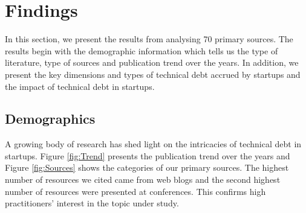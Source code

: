 
\section{Findings}\label{Sec:Results}
In this section, we present the results from analysing 70 primary sources.
The results begin with the demographic information which tells us the type of literature, type of sources and publication trend over the years.
In addition, we present the key dimensions and types of technical debt accrued by startups and the impact of technical debt in startups.

\subsection{Demographics}
A growing body of research has shed light on the intricacies of technical debt in startups.
Figure \ref{fig:Trend} presents the publication trend over the years and Figure \ref{fig:Sources} shows the categories of our primary sources.
The highest number of resources we cited came from web blogs and the second highest number of resources were presented at conferences.
This confirms high practitioners' interest in the topic under study.


